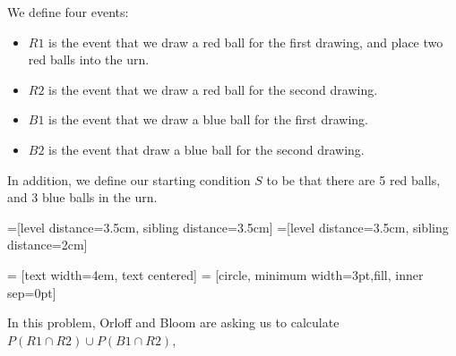 \documentclass[a4paper,11pt]{article}
\begin{document}
We define four events:
\begin{itemize}
  \item $R1$ is the event that we draw a red ball for the first drawing, 
  and place two red balls into the urn.

  \item $R2$ is the event that we draw a red ball for the second 
    drawing.

  \item $B1$ is the event that we draw a blue ball for the first 
    drawing.

  \item $B2$ is the event that draw a blue ball for the second drawing.
\end{itemize}

In addition, we define our starting condition $S$ to be that there
are 5 red balls, and 3 blue balls in the urn.

=[level distance=3.5cm, sibling distance=3.5cm]
=[level distance=3.5cm, sibling distance=2cm]

 = [text width=4em, text centered]
 = [circle, minimum width=3pt,fill, inner sep=0pt]


In this problem, Orloff and Bloom are asking us to calculate 
$P\left( R1 \cap R2 \right) \cup P \left( B1 \cap R2 \right)$,
\end{document}
